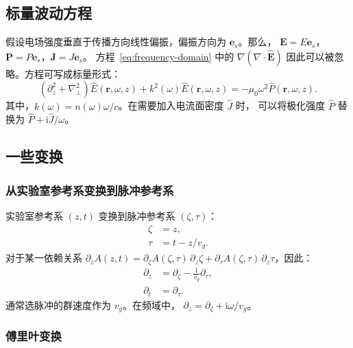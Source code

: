 \documentclass[a4paper,12pt]{ctexart}
\numberwithin{equation}{section}
\newcommand{\vect}[1]{\bm{#1}}
\begin{document}
\subsection{标量波动方程}
假设电场强度垂直于传播方向线性偏振，偏振方向为 $\vect{e}_s$。那么，
$\vect{E}=E\vect{e}_s$，$\vect{P}=P\vect{e}_s$，$\vect{J}=J\vect{e}_s$。
方程~\eqref{eq:frequency-domain} 中的
$\nabla(\nabla\cdot\hat{\vect{E}})$ 因此可以被忽略。方程可写成标量形式：
\begin{equation}
  \left(\partial_z^2+\nabla_\perp^2\right)\hat{E}(\vect{r},\omega,z)
  +k^2(\omega)\hat{E}(\vect{r},\omega,z)
  =-\mu_0\omega^2\hat{P}(\vect{r},\omega,z).
  \label{eq:scalar-form}
\end{equation}
其中，$k(\omega)=n(\omega)\omega/c$。在需要加入电流面密度 $\hat{J}$ 时，
可以将极化强度 $\hat{P}$ 替换为 $\hat{P}+\mathrm{i}\hat{J}/\omega$。

\subsection{一些变换}

\subsubsection{从实验室参考系变换到脉冲参考系}
实验室参考系 $(z,t)$ 变换到脉冲参考系 $(\zeta,\tau)$：
\begin{equation}
  \begin{aligned}
    \zeta & = z,       \\
    \tau  & = t-z/v_g.
  \end{aligned}
\end{equation}
对于某一依赖关系
$\partial_z A(z,t)=\partial_\zeta A(\zeta,\tau)\,\partial_z\zeta
  +\partial_\tau A(\zeta,\tau)\,\partial_z\tau$，因此：
\begin{equation}
  \begin{aligned}
    \partial_z & = \partial_\zeta-\frac{1}{v_g}\partial_\tau, \\
    \partial_t & = \partial_\tau.
  \end{aligned}
  \label{eq:frame}
\end{equation}
通常选脉冲的群速度作为 $v_g$。在频域中，
$\partial_z=\partial_\zeta+\mathrm{i}\omega/v_g$。

\subsubsection{傅里叶变换}
\end{document}
